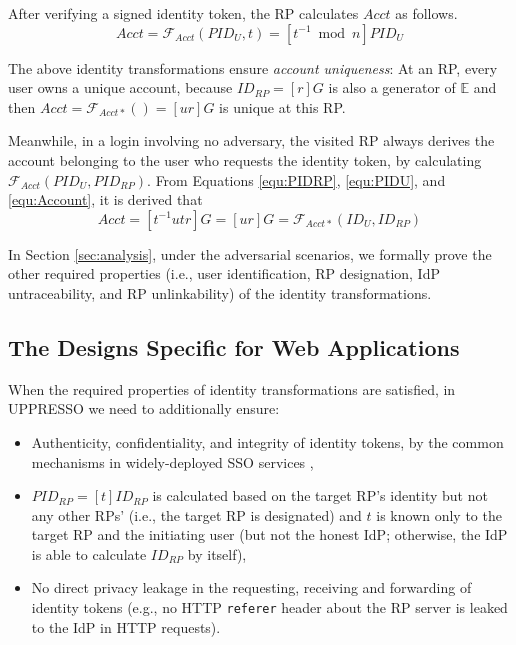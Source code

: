 
After verifying a signed identity token, the RP calculates $Acct$ as follows.
\begin{equation}
Acct = \mathcal{F}_{Acct}(PID_{U},t)
   = [t^{-1} \bmod n]PID_{U}
   \label{equ:Account}
\end{equation}

The above identity transformations ensure \emph{account uniqueness}:
    At an RP, every user owns a unique account, because $ID_{RP} = [r]G$ is also a generator of $\mathbb{E}$ and then
     $Acct = \mathcal{F}_{Acct\ast}()=[ur]G$ is unique at this RP.

Meanwhile, in a login involving no adversary,
 the visited RP always derives the account belonging to the user who requests the identity token,
    by calculating $\mathcal{F}_{Acct}(PID_{U}, PID_{RP})$.
From Equations \ref{equ:PIDRP}, \ref{equ:PIDU}, and \ref{equ:Account}, it is derived that
\begin{equation}
   Acct =  [t^{-1}utr]G = [ur]G = \mathcal{F}_{Acct\ast}(ID_U, ID_{RP})
   \label{equ:AccountNotChanged}
\end{equation}


In Section \ref{sec:analysis},
    under the adversarial scenarios, we formally prove the other required properties (i.e.,
    user identification, RP designation, IdP untraceability, and RP unlinkability) of the identity transformations.

\subsection{The Designs Specific for Web Applications}
\label{sec:web-design}

When the required properties of identity transformations are satisfied,
    in UPPRESSO we need to additionally ensure:
\begin{itemize}
  \item Authenticity, confidentiality, and integrity of identity tokens,
  by the common mechanisms in widely-deployed SSO services \cite{OpenIDConnect, rfc6749, SAML,GoogleIdIntegrate,de2014oauth,FettKS14,BrowserID,uber},
  \item $PID_{RP} = [t]{ID_{RP}}$ is calculated based on the target RP's identity but not any other RPs' (i.e., the target RP is designated) and $t$ is known only to the target RP and the initiating user (but not the honest IdP; otherwise, the IdP is able to calculate $ID_{RP}$ by itself),
  \item 
No direct privacy leakage in the requesting, receiving and forwarding of identity tokens
(e.g., no HTTP \texttt{referer} header about the RP server is leaked to the IdP in HTTP requests).
\end{itemize}

